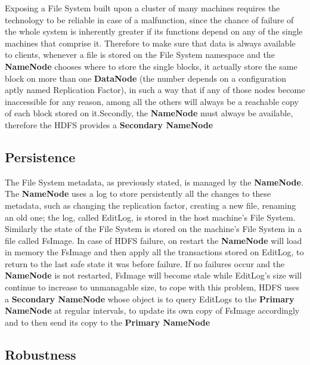 Exposing a File System built upon a cluster of many machines requires the technology to be reliable in case of a malfunction, since the chance of failure of the whole system is inherently greater if its functions depend on any of the single machines that comprise it. \newline Therefore to make sure that data is always available to clients, whenever a file is stored on the File System namespace and the \textbf{NameNode} chooses where to store the single blocks, it actually store the same block on more than one \textbf{DataNode} (the number depends on a configuration aptly named Replication Factor), in such a way that if any of those nodes become inaccessible for any reason, among all the others will always be a reachable copy of each block stored on it.\newline Secondly, the \textbf{NameNode} must always be available, therefore the HDFS provides a \textbf{Secondary NameNode}

\subsection{Persistence}

The File System metadata, as previously stated, is managed by the \textbf{NameNode}. The \textbf{NameNode} uses a log to store persistently all the changes to these metadata, such as changing the replication factor, creating a new file, renaming an old one; the log, called EditLog, is stored in the host machine's File System. Similarly the state of the File System is stored on the machine's File System in a file called FsImage.\newline
In case of HDFS failure, on restart the \textbf{NameNode} will load in memory the FsImage and then apply all the transactions stored on EditLog, to return to the last safe state it was before failure.
\newline
If no failures occur and the \textbf{NameNode} is not restarted, FsImage will become stale while EditLog's size will continue to increase to unmanagable size, to cope with this problem, HDFS uses a \textbf{Secondary NameNode} whose object is to query EditLogs to the \textbf{Primary NameNode} at regular intervals, to update its own copy of FsImage accordingly and to then send its copy to the \textbf{Primary NameNode}

\subsection{Robustness}

